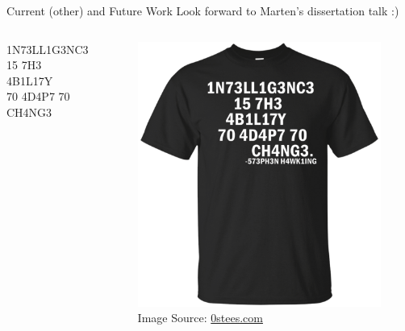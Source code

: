 \begin{frame}{Current (other) and Future Work}
  \pause
  Look forward to Marten's dissertation talk :)
\end{frame}

\begin{frame}[standout]
  \begin{columns}
    \centering
    1N73LL1G3NC3 \\
    15 7H3 \\
    4B1L17Y \\
    70 4D4P7 70 \\
    CH4NG3
    \pause
    \begin{figure}
      \centering
      \includegraphics[height=\textwidth]{figures/shirt.png}
      \caption{\color{white} Image Source: \href{https://www.0stees.com/products/intelligence-is-the-ability-to-adapt-to-change-shirt-hoodie-tank?variant=40350207242}{0stees.com}}
    \end{figure}
  \end{columns}
\end{frame}

